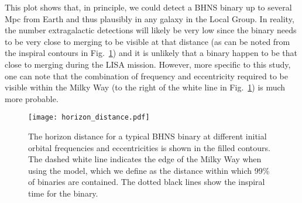 This plot shows that, in principle, we could detect a BHNS binary up to several Mpc from Earth and thus plausibly in any galaxy in the Local Group. In reality, the number extragalactic detections will likely be very low since the binary needs to be very close to merging to be visible at that distance (as can be noted from the inspiral contours in Fig.~\ref{fig:bhns_horizon_distance}) and it is unlikely that a binary happen to be that close to merging during the LISA mission. However, more specific to this study, one can note that the combination of frequency and eccentricity required to be visible within the Milky Way (to the right of the white line in Fig.~\ref{fig:bhns_horizon_distance}) is much more probable.

\begin{figure}[htb]
    \centering
    \texttt{[image: horizon\_distance.pdf]}
    \caption{The horizon distance for a typical BHNS binary at different initial orbital frequencies and eccentricities is shown in the filled contours. The dashed white line indicates the edge of the Milky Way when using the \cite{Frankel+2018} model, which we define as the distance within which 99\% of binaries are contained. The dotted black lines show the inspiral time for the binary.}
    \label{fig:bhns_horizon_distance}
\end{figure}